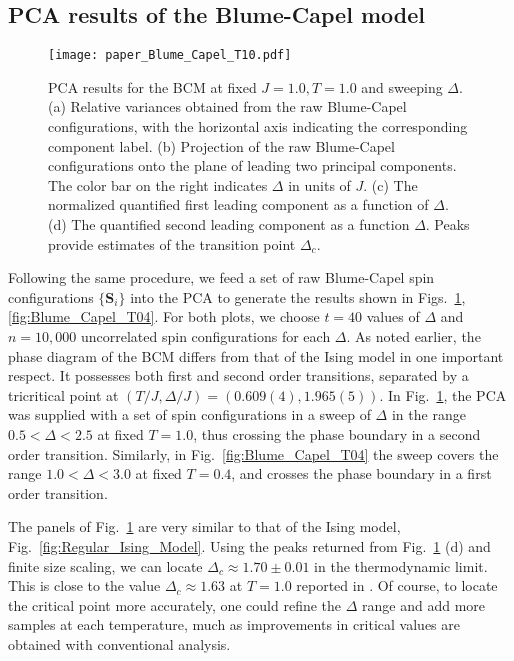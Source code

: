 \documentclass[pra,letterpaper,10pt,twocolumn]{revtex4}
\begin{document}
\subsection{PCA results of the Blume-Capel model}


\begin{figure}[!h]
\texttt{[image: paper\_Blume\_Capel\_T10.pdf]}  
\caption{
PCA results for the BCM at fixed $J=1.0, T=1.0$ 
and sweeping $\Delta$. 
(a) Relative variances obtained from the raw Blume-Capel
configurations, with the horizontal axis 
indicating the corresponding component label. (b) Projection
of the raw Blume-Capel configurations onto the plane of leading two
principal components. The color bar on
the right indicates $\Delta$ in units of $J$. (c) The normalized
quantified first leading component as a function of
$\Delta$. (d) The quantified second leading component as a function
$\Delta$. Peaks provide estimates of the transition point $\Delta_c$. 
\label{fig:Blume_Capel_T10}
}
\end{figure}

Following the same procedure, we feed a set of raw Blume-Capel 
spin configurations
$\{\mathbf{S}_i\}$ into the PCA to generate the results shown in
Figs.~\ref{fig:Blume_Capel_T10}, \ref{fig:Blume_Capel_T04}.
For both plots, we choose $t=40$ values of $\Delta$ and $n=10,000$
uncorrelated spin configurations for each $\Delta$. 
As noted earlier, 
the phase diagram of the BCM differs from that of
the Ising model in one important respect.  It
possesses both first and second order
transitions, separated by a tricritical point at 
$(T/J,\Delta/J)=(0.609(4),1.965(5))$.
In Fig.~\ref{fig:Blume_Capel_T10}, the PCA was
supplied with a set of spin configurations in a
sweep of $\Delta$ in the range
$0.5 < \Delta < 2.5$ at fixed $T=1.0$, thus crossing
the phase boundary in a second order transition.
Similarly, in Fig.~\ref{fig:Blume_Capel_T04} the sweep 
covers the range $1.0 < \Delta < 3.0$ at fixed $T=0.4$, and
crosses the phase boundary in a first order transition.

The panels of Fig.~\ref{fig:Blume_Capel_T10} are very similar
to that of the Ising model, 
Fig.~\ref{fig:Regular_Ising_Model}.
Using the peaks returned from
Fig.~\ref{fig:Blume_Capel_T10} (d) and finite size scaling, we can
locate $\Delta_c \approx 1.70 \pm 0.01$ in the thermodynamic limit. 
This is close to the value $\Delta_c \approx 1.63$ at 
$T=1.0$ reported in \cite{Pittman08}. 
Of course, to
locate the critical point more accurately, one could refine the
$\Delta$ range and add more samples at each temperature, much
as improvements in critical values are obtained with conventional analysis.
\end{document}
